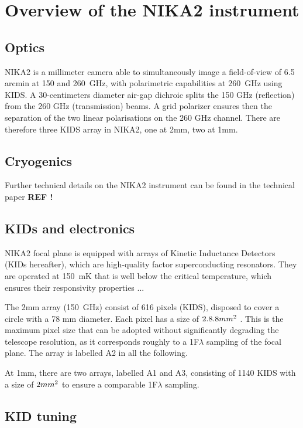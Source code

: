 
\section{Overview of the NIKA2 instrument}

\subsection{Optics}

NIKA2 is a millimeter camera able to simultaneously image a
field-of-view of 6.5\,arcmin at 150 and 260~GHz, with polarimetric
capabilities at 260~GHz using KIDS. A 30-centimeters diameter air-gap
dichroic splits the 150 GHz (reflection) from the 260 GHz
(transmission) beams.  A grid polarizer ensures then the separation of
the two linear polarisations on the 260 GHz channel.  There are
therefore three KIDS array in NIKA2, one at 2mm, two at 1mm. 




\subsection{Cryogenics}
Further technical details on the NIKA2 instrument can be found in the
technical paper {\bf REF !}



\subsection{KIDs and electronics}

NIKA2 focal plane is equipped with arrays of Kinetic Inductance
Detectors (KIDs hereafter), which are high-quality factor
superconducting resonators. They are operated at 150~mK that is well
below the critical temperature, which ensures their responsivity
properties ... 


The 2mm array (150~GHz) consist of 616 pixels
(KIDS), disposed to cover a circle with a 78 mm diameter. Each pixel
has a size of $2.8 \time 2.8 mm^{2}$ . This is the maximum pixel size that can
be adopted without significantly degrading the telescope resolution,
as it corresponds roughly to a 1F$\lambda$ sampling of the focal
plane.  The array is labelled A2 in all the following.

At 1mm, there are two arrays, labelled A1 and A3, consisting of 1140
KIDS with a size of $2 \time 2 mm^{2}$ to ensure a comparable 1F$\lambda$
sampling.




\subsection{KID tuning}





